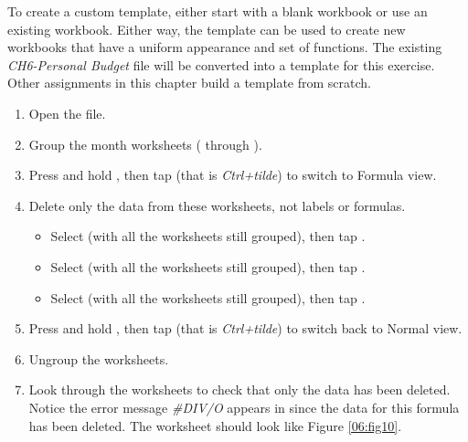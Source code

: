 To create a custom template, either start with a blank workbook or use an existing workbook. Either way, the template can be used to create new workbooks that have a uniform appearance and set of functions. The existing \textit{CH6-Personal Budget} file will be converted into a template for this exercise. Other assignments in this chapter build a template from scratch.

\begin{enumbox}
	\begin{enumerate}
		\item Open the  file.
		\item Group the month worksheets ( through ).
		\item Press and hold , then tap \fmtKeystroke{$ \sim $} (that is \textit{Ctrl+tilde}) to switch to Formula view.
		\item Delete only the data from these worksheets, not labels or formulas. 
	
		\begin{itemize}
			\item Select  (with all the worksheets still grouped), then tap .
			\item Select  (with all the worksheets still grouped), then tap .
			\item Select  (with all the worksheets still grouped), then tap .
		\end{itemize}	
	
	\item Press and hold , then tap \fmtKeystroke{$ \sim $} (that is \textit{Ctrl+tilde}) to switch back to Normal view.
		\item Ungroup the worksheets. 
		\item Look through the worksheets to check that only the data has been deleted. Notice the error message \textit{\#DIV/O} appears in  since the data for this formula has been deleted. The  worksheet should look like Figure \ref{06:fig10}.
	\end{enumerate}
\end{enumbox}
	

